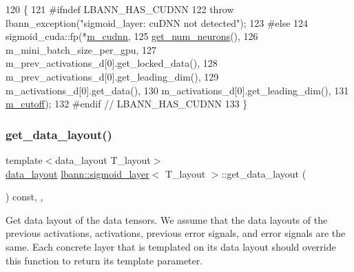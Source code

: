 \begin{DoxyCode}
120                                  \{
121 \textcolor{preprocessor}{  #ifndef LBANN\_HAS\_CUDNN}
122     \textcolor{keywordflow}{throw} lbann\_exception(\textcolor{stringliteral}{"sigmoid\_layer: cuDNN not detected"});
123 \textcolor{preprocessor}{  #else}
124     sigmoid\_cuda::fp(*\hyperlink{classlbann_1_1Layer_a08dbb94239e3b8c96329786c57c72e21}{m\_cudnn},
125                      \hyperlink{classlbann_1_1Layer_aa4de686cc6c2dd38166f42faf874f227}{get\_num\_neurons}(),
126                      m\_mini\_batch\_size\_per\_gpu,
127                      m\_prev\_activations\_d[0].get\_locked\_data(),
128                      m\_prev\_activations\_d[0].get\_leading\_dim(),
129                      m\_activations\_d[0].get\_data(),
130                      m\_activations\_d[0].get\_leading\_dim(),
131                      \hyperlink{classlbann_1_1sigmoid__layer_ab4a50a9ae123aef61ff3f0c9c066bdff}{m\_cutoff});
132 \textcolor{preprocessor}{  #endif // LBANN\_HAS\_CUDNN}
133   \}
\end{DoxyCode}
\mbox{\label{classlbann_1_1sigmoid__layer_ab44f3cf5e4622578e40d5254ba73109a}} 
\subsubsection{\texorpdfstring{get\+\_\+data\+\_\+layout()}{get\_data\_layout()}}
{\footnotesize\ttfamily template$<$data\+\_\+layout T\+\_\+layout$>$ \\
\hyperlink{base_8hpp_a786677cbfb3f5677b4d84f3056eb08db}{data\+\_\+layout} \hyperlink{classlbann_1_1sigmoid__layer}{lbann\+::sigmoid\+\_\+layer}$<$ T\+\_\+layout $>$\+::get\+\_\+data\+\_\+layout (\begin{DoxyParamCaption}{ }\end{DoxyParamCaption}) const\hspace{0.3cm}{\ttfamily [inline]}, {\ttfamily [override]}, {\ttfamily [virtual]}}

Get data layout of the data tensors. We assume that the data layouts of the previous activations, activations, previous error signals, and error signals are the same. Each concrete layer that is templated on its data layout should override this function to return its template parameter. 

